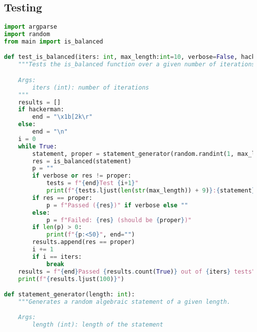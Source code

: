 \documentclass{report}
\begin{document}
\subsection{Testing}
\begin{lstlisting}[language=python]
import argparse
import random
from main import is_balanced

def test_is_balanced(iters: int, max_length:int=10, verbose=False, hackerman=False):
    """Tests the is_balanced function over a given number of iterations.

    Args:
        iters (int): number of iterations
    """
    results = []
    if hackerman:
        end = "\x1b[2k\r"
    else:
        end = "\n"
    i = 0
    while True:
        statement, proper = statement_generator(random.randint(1, max_length))
        res = is_balanced(statement)
        p = ""
        if verbose or res != proper:
            tests = f"{end}Test {i+1}"
            print(f"{tests.ljust(len(str(max_length)) + 9)}:{statement}:", end=" ", flush=True)
        if res == proper:
            p = f"Passed ({res})" if verbose else ""
        else:
            p = f"Failed: {res} (should be {proper})"
        if len(p) > 0:
            print(f"{p:<50}", end="")
        results.append(res == proper)
        i += 1
        if i == iters:
            break
    results = f"{end}Passed {results.count(True)} out of {iters} tests"
    print(f"{results.ljust(100)}")

def statement_generator(length: int):
    """Generates a random algebraic statement of a given length.

    Args:
        length (int): length of the statement


\end{lstlisting}
\end{document}

